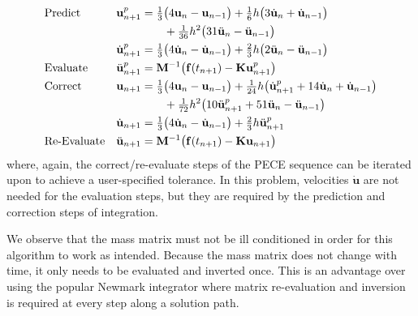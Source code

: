 \begin{subequations}
    \notag
    \begin{align}
    \mbox{} & \text{Predict} &
    \mathbf{u}_{n+1}^p & = \tfrac{1}{3} \bigl(
    4 \mathbf{u}_n - \mathbf{u}_{n-1} \bigr) + 
    \tfrac{1}{6} h \bigl( 3 \dot{\mathbf{u}}_n + 
    \dot{\mathbf{u}}_{n-1} \bigr) \\ & & & \qquad + 
    \tfrac{1}{36} h^2 \bigl( 31 \ddot{\mathbf{u}}_n - 
    \ddot{\mathbf{u}}_{n-1} \bigr) \\
    \mbox{} & &
    \dot{\mathbf{u}}_{n+1}^p & = \tfrac{1}{3} 
    \bigl( 4 \dot{\mathbf{u}}_n - \dot{\mathbf{u}}_{n-1} \bigr) + 
    \tfrac{2}{3} h \bigl( 2 \ddot{\mathbf{u}}_n - \ddot{\mathbf{u}}_{n-1} \bigr) \\
    \mbox{} & \text{Evaluate} &
    \ddot{\mathbf{u}}^p_{n+1} & = \mathbf{M}^{-1} \bigl( \mathbf{f}(t_{n+1} ) - 
    \mathbf{K} \mathbf{u}_{n+1}^p \bigr) \\
    \mbox{} & \text{Correct} & 
    \mathbf{u}_{n+1} & = \tfrac{1}{3} \bigl(
    4  \mathbf{u}_n - \mathbf{u}_{n-1} \bigr) +
    \tfrac{1}{24} h \bigl( \dot{\mathbf{u}}^p_{n+1} +
    14 \dot{\mathbf{u}}_n + \dot{\mathbf{u}}_{n-1} \bigr)  \\
    \mbox{} & & & \qquad +
    \tfrac{1}{72} h^2 \bigl( 10 \ddot{\mathbf{u}}^p_{n+1} + 
    51 \ddot{\mathbf{u}}_n - \ddot{\mathbf{u}}_{n-1} \bigr) \\ 
    \mbox{} & &
    \dot{\mathbf{u}}_{n+1} & = \tfrac{1}{3} 
    \bigl( 4 \dot{\mathbf{u}}_n - \dot{\mathbf{u}}_{n-1} \bigr) + 
    \tfrac{2}{3} h \ddot{\mathbf{u}}^p_{n+1}  \\
    \mbox{} & \text{Re-Evaluate} & 
    \ddot{\mathbf{u}}_{n+1} & = \mathbf{M}^{-1} \bigl( \mathbf{f}(t_{n+1} ) - 
    \mathbf{K} \mathbf{u}_{n+1} \bigr) 
    \end{align}
\end{subequations}
where, again, the correct\slash re-evaluate steps of the PECE sequence can be iterated upon to achieve a user-specified tolerance.  In this problem, velocities $\dot{\mathbf{u}}$ are not needed for the evaluation steps, but they are required by the prediction and correction steps of integration.

We observe that the mass matrix must not be ill conditioned in order for this algorithm to work as intended.  Because the mass matrix does not change with time, it only needs to be evaluated and inverted once.  This is an advantage over using the popular Newmark \cite{Newmark59} integrator where matrix re-evaluation and inversion is required at every step along a solution path.


